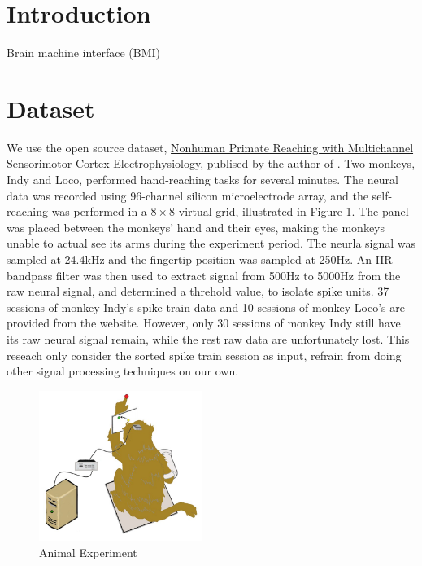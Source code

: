 \documentclass[8pt,a4paper]{article}
\begin{document}
\begin{multicols}{2}

\section*{Introduction}

Brain machine interface (BMI) 

\section*{Dataset}

We use the open source dataset, \href{https://zenodo.org/record/583331#.XWirEigzZPb}{Nonhuman Primate Reaching with Multichannel Sensorimotor Cortex Electrophysiology}, 
publised by the author of \cite{makin2018}. Two monkeys, Indy and Loco, performed hand-reaching tasks for several minutes. 
The neural data was recorded using 96-channel silicon microelectrode array, and the self-reaching was performed in a  $8 \times 8$ virtual grid, illustrated in Figure \ref{fig:monkey_drawing}.
The panel was placed between the monkeys' hand and their eyes, making the monkeys unable to actual see its arms during the experiment period. 
The neurla signal was sampled at 24.4kHz and the fingertip position was sampled at 250Hz. 
An IIR bandpass filter was then used to extract signal from 500Hz to 5000Hz from the raw neural signal, and determined a threhold value, to isolate spike units. 
37 sessions of monkey Indy's spike train data and 10 sessions of monkey Loco's are provided from the website.  
However, only 30 sessions of monkey Indy still have its raw neural signal remain, while the rest raw data are unfortunately lost. 
This reseach only consider the sorted spike train session as input, refrain from doing other signal processing techniques on our own.


\begin{figure}[H]
  \begin{center}
      \includegraphics[width=150pt]{./Figures/monkey.jpg}
      \caption{Animal Experiment}
      \label{fig:monkey_drawing}
  \end{center}
\end{figure}



\end{multicols}
\end{document}
